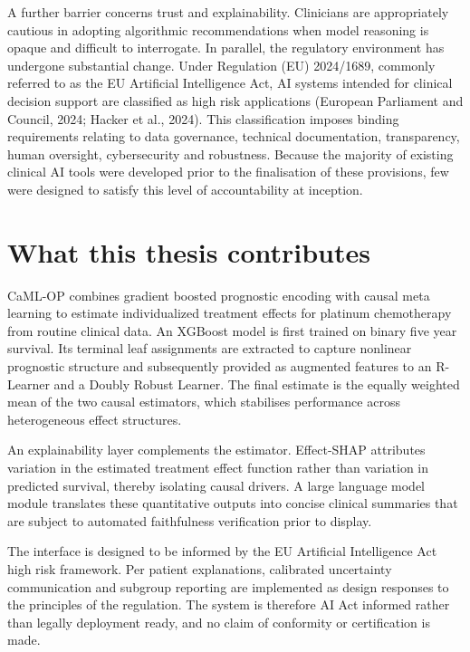 A further barrier concerns trust and explainability. Clinicians are appropriately cautious in adopting algorithmic recommendations when model reasoning is opaque and difficult to interrogate. In parallel, the regulatory environment has undergone substantial change. Under Regulation (EU) 2024/1689, commonly referred to as the EU Artificial Intelligence Act, AI systems intended for clinical decision support are classified as high risk applications (European Parliament and Council, 2024; Hacker et al., 2024). This classification imposes binding requirements relating to data governance, technical documentation, transparency, human oversight, cybersecurity and robustness. Because the majority of existing clinical AI tools were developed prior to the finalisation of these provisions, few were designed to satisfy this level of accountability at inception.

\section{What this thesis contributes}\label{what-this-thesis-contributes}

CaML-OP combines gradient boosted prognostic encoding with causal meta learning to estimate individualized treatment effects for platinum chemotherapy from routine clinical data. An XGBoost model is first trained on binary five year survival. Its terminal leaf assignments are extracted to capture nonlinear prognostic structure and subsequently provided as augmented features to an R-Learner and a Doubly Robust Learner. The final estimate is the equally weighted mean of the two causal estimators, which stabilises performance across heterogeneous effect structures.

An explainability layer complements the estimator. Effect-SHAP attributes variation in the estimated treatment effect function rather than variation in predicted survival, thereby isolating causal drivers. A large language model module translates these quantitative outputs into concise clinical summaries that are subject to automated faithfulness verification prior to display.

The interface is designed to be informed by the EU Artificial Intelligence Act high risk framework. Per patient explanations, calibrated uncertainty communication and subgroup reporting are implemented as design responses to the principles of the regulation. The system is therefore AI Act informed rather than legally deployment ready, and no claim of conformity or certification is made.

